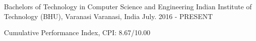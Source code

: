 \begin{cventries}
  \cventry
    {Bachelors of Technology in Computer Science and Engineering}
    {Indian Institute of Technology (BHU), Varanasi}
    {Varanasi, India}
    {July. 2016 - PRESENT}
    {
      \begin{cvitems}
        \item {Cumulative Performance Index, CPI: 8.67/10.00}
      \end{cvitems}
    }
\end{cventries}
